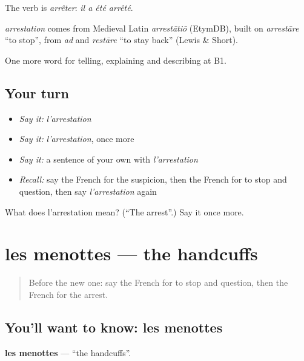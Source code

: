 The verb is \emph{arrêter}: \emph{il a été arrêté}.

\begin{cousinweb}
\emph{arrestation} comes from Medieval Latin \emph{arrestātiō} (EtymDB), built on \emph{arrestāre} \textquotedblleft{}to stop\textquotedblright{}, from \emph{ad} and \emph{restāre} \textquotedblleft{}to stay back\textquotedblright{} (Lewis \& Short).
\end{cousinweb}

\begin{grammarlens}[title={What you've built}]
One more word for telling, explaining and describing at B1.
\end{grammarlens}

\subsection*{Your turn}
\begin{itemize}
\raggedright
  \item \emph{Say it:} \emph{l'arrestation}
  \item \emph{Say it:} \emph{l'arrestation}, once more
  \item \emph{Say it:} a sentence of your own with \emph{l'arrestation}
  \item \emph{Recall:} say the French for the suspicion, then the French for to stop and question, then say \emph{l'arrestation} again
\end{itemize}

\begin{tcolorbox}[breakable,colback=teal!4,colframe=teal!35!black,title={Before you move on}]
What does l'arrestation mean? (\textquotedblleft{}The arrest\textquotedblright{}.) Say it once more.
\end{tcolorbox}
\section[les menottes]{les menottes — the handcuffs}

\label{lesson:FR-C294-menottes}



\begin{quote}
Before the new one: say the French for to stop and question, then the French for the arrest.
\end{quote}

\subsection*{You'll want to know: les menottes}
\textbf{les menottes} — \textquotedblleft{}the handcuffs\textquotedblright{}.


